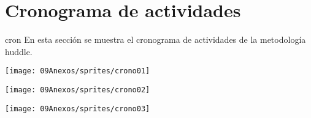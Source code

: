 \section{Cronograma de actividades} cron
En esta sección se muestra el cronograma de actividades de la metodología huddle.

\begin{center}
\texttt{[image: 09Anexos/sprites/crono01]}
\end{center}

\begin{center}
\texttt{[image: 09Anexos/sprites/crono02]}
\end{center}

\begin{center}
\texttt{[image: 09Anexos/sprites/crono03]}
\end{center}
